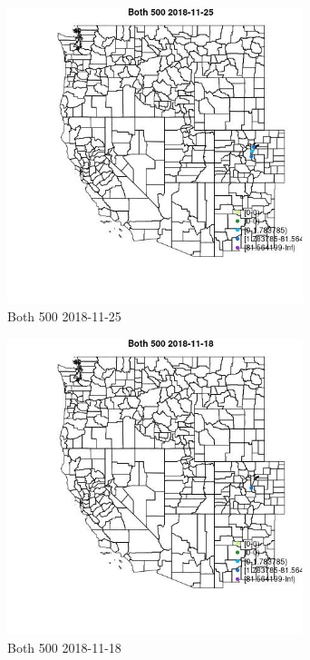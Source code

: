 \begin{figure} 
\centering  
\includegraphics[width=0.77\textwidth]{Code_Outputs/Report_ML_input_PM25_Step4_part_e_de_duplicated_aveswNAs_MapObsBoth_5002018-11-25.jpg} 
\caption{\label{fig:Report_ML_input_PM25_Step4_part_e_de_duplicated_aveswNAsMapObsBoth_5002018-11-25}Both 500 2018-11-25} 
\end{figure} 
 

\clearpage 

\begin{figure} 
\centering  
\includegraphics[width=0.77\textwidth]{Code_Outputs/Report_ML_input_PM25_Step4_part_e_de_duplicated_aveswNAs_MapObsBoth_5002018-11-18.jpg} 
\caption{\label{fig:Report_ML_input_PM25_Step4_part_e_de_duplicated_aveswNAsMapObsBoth_5002018-11-18}Both 500 2018-11-18} 
\end{figure} 
 

